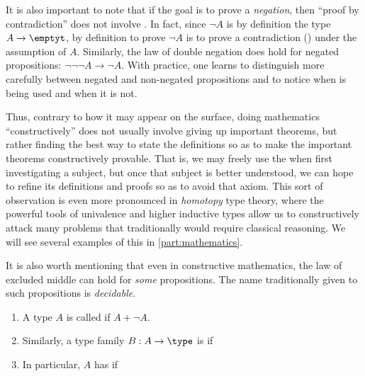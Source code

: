 It is also important to note that if the goal is to prove a \emph{negation}, then ``proof by contradiction'' does not involve \LEM{}.
In fact, since $\neg A$ is by definition the type $A\to\emptyt$, by definition to prove $\neg A$ is to prove a contradiction (\emptyt) under the assumption of $A$.
Similarly, the law of double negation does hold for negated propositions: $\neg\neg\neg A \to \neg A$.
With practice, one learns to distinguish more carefully between negated and non-negated propositions and to notice when \LEM{} is being used and when it is not.

Thus, contrary to how it may appear on the surface, doing mathematics ``constructively'' does not usually involve giving up important theorems, but rather finding the best way to state the definitions so as to make the important theorems constructively provable.
That is, we may freely use the \LEM{} when first investigating a subject, but once that subject is better understood, we can hope to refine its definitions and proofs so as to avoid that axiom.
This sort of observation is even more pronounced in \emph{homotopy} type theory, where the powerful tools of univalence and higher inductive types allow us to constructively attack many problems that traditionally would require classical reasoning.
We will see several examples of this in \cref{part:mathematics}.

It is also worth mentioning that even in constructive mathematics, the law of excluded middle can hold for \emph{some} propositions.
The name traditionally given to such propositions is \emph{decidable}.

\begin{defn}\label{defn:decidable-equality}
  \mbox{}
  \begin{enumerate}
  \item A type $A$ is called 
    if $A+\neg A$.
  \item Similarly, a type family $B:A\to \type$ is 
    if  \label{item:decidable-equality2}
  \item In particular, $A$ has 
    if 
  \end{enumerate}
\end{defn}

